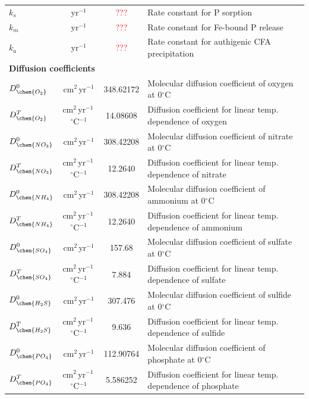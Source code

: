 \documentclass[gmd, manuscript]{copernicus}
\begin{document}
\begin{table}[hbtp]
\begin{tabular}{l c c l}
$k_s$ & yr$^{-1}$ & \textcolor{red}{???} & Rate constant for P sorption\\
$k_m$ & yr$^{-1}$ & \textcolor{red}{???} & Rate constant for Fe-bound P release\\
$k_a$ & yr$^{-1}$ & \textcolor{red}{???} & Rate constant for authigenic CFA precipitation\\
\multicolumn{4}{l}{\textbf{Diffusion coefficients} \citep{Li_diffusion_1974, gypens_simple_2008}}\\
$D_{\chem{O_2}}^0$ & cm$^2$\,yr$^{-1}$ & 348.62172 &Molecular diffusion coefficient of oxygen at 0$^\circ$C\\
$D_{\chem{O_2}}^T$ & cm$^2$\,yr$^{-1}$\,${}^{\circ}$C$^{-1}$ & 14.08608 &Diffusion coefficient for linear temp. dependence of oxygen\\ %
$D_{\chem{NO_3}}^0$ & cm$^2$\,yr$^{-1}$ & 308.42208 &Molecular diffusion coefficient of nitrate at 0$^\circ$C\\
$D_{\chem{NO_3}}^T$ & cm$^2$\,yr$^{-1}$\,${}^{\circ}$C$^{-1}$ & 12.2640 &Diffusion coefficient for linear temp. dependence of nitrate\\ %
$D_{\chem{NH_4}}^0$ & cm$^2$\,yr$^{-1}$ & 308.42208 &Molecular diffusion coefficient of ammonium at 0$^\circ$C\\
$D_{\chem{NH_4}}^T$ & cm$^2$\,yr$^{-1}$\,${}^{\circ}$C$^{-1}$ & 12.2640 &Diffusion coefficient for linear temp. dependence of ammonium\\ %
$D_{\chem{SO_4}}^0$ & cm$^2$\,yr$^{-1}$ & 157.68 &Molecular diffusion coefficient of sulfate at 0$^\circ$C\\
$D_{\chem{SO_4}}^T$ & cm$^2$\,yr$^{-1}$\,${}^{\circ}$C$^{-1}$ & 7.884 &Diffusion coefficient for linear temp. dependence of sulfate\\ %
$D_{\chem{H_2S}}^0$ & cm$^2$\,yr$^{-1}$ & 307.476 & Molecular diffusion coefficient of sulfide at 0$^\circ$C\\
$D_{\chem{H_2S}}^T$ & cm$^2$\,yr$^{-1}$\,${}^{\circ}$C$^{-1}$ & 9.636 & Diffusion coefficient for linear temp. dependence of sulfide\\ %
$D_{\chem{PO_4}}^0$ & cm$^2$\,yr$^{-1}$ & 112.90764 &Molecular diffusion coefficient of phosphate at 0$^\circ$C\\
$D_{\chem{PO_4}}^T$ & cm$^2$\,yr$^{-1}$\,${}^{\circ}$C$^{-1}$ & 5.586252 &Diffusion coefficient for linear temp. dependence of phosphate\\ %
\hline\hline
\end{tabular}
\label{table:sed-charac_transport-parameters}
\end{table}
\end{document}
